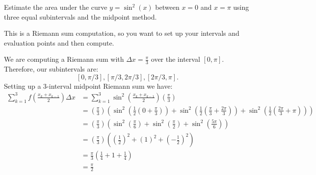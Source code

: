 \documentclass{ximera}
\author{Emma Smith Zbarsky}
\begin{document}
\begin{exercise}

Estimate the area under the curve $y=\sin^2(x)$ between $x=0$ and
$x=\pi$ using three equal subintervals and the midpoint method.


\begin{hint}
This is a Riemann sum computation, so you want to set up your intervals
and evaluation points and then compute.
\end{hint}


\begin{hint}
We are computing a Riemann sum with $\Delta x = \frac{\pi}{3}$ over the
interval $[0,\pi]$. Therefore, our subintervals are:
\[[0,\pi/3], [\pi/3,2\pi/3], [2\pi/3,\pi].\] Setting up a 3-interval
midpoint Riemann sum we have: \begin{align*}
\sum_{k=1}^3 f\left(\frac{x_k+x_{k-1}}{2}\right) \Delta x &= \sum_{k=1}^3 \sin^2\left(\frac{x_k+x_{k-1}}{2}\right) \left(\frac{\pi}{3}\right) \\
&= \left(\frac{\pi}{3}\right)\left(\sin^2\left(\frac{1}{2}\left(0+\frac{\pi}{3}\right)\right)+\sin^2\left(\frac{1}{2}\left(\frac{\pi}{3}+\frac{2\pi}{3}\right)\right) + \sin^2\left(\frac{1}{2}\left(\frac{2\pi}{3}+\pi\right)\right)\right) \\
&= \left(\frac{\pi}{3}\right)\left(\sin^2\left(\frac{\pi}{6}\right)+\sin^2\left(\frac{\pi}{2}\right) + \sin^2\left(\frac{5\pi}{6}\right)\right) \\
&= \left(\frac{\pi}{3}\right)\left(\left(\frac{1}{2}\right)^2 + \left(1\right)^2 + \left(-\frac{1}{2}\right)^2\right) \\
&= \frac{\pi}{3}\left(\frac{1}{4}+1+\frac{1}{4}\right) \\
&= \boxed{\frac{\pi}{2}}
\end{align*}
\end{hint}


\begin{multipleChoice}
\end{multipleChoice}

\end{exercise}
\end{document}
